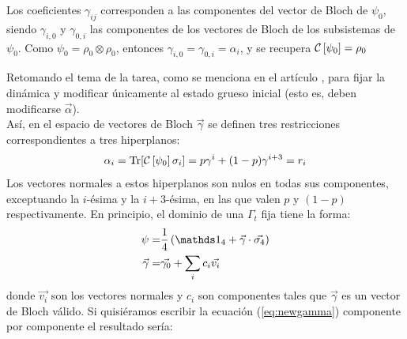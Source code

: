 Los coeficientes $\gamma_{ij}$ corresponden a las componentes del vector de Bloch de $\psi_{0}$, siendo $\gamma_{i,0}$ y $\gamma_{0,i}$ las componentes de los vectores de Bloch de los subsistemas de $\psi_{0}$. Como $\psi_{0}=\rho_{0}\otimes\rho_{0}$, entonces $\gamma_{i,0}=\gamma_{0,i}=\alpha_{i}$, y se recupera $\mathcal{C}\left[\psi_{0}\right]=\rho_{0}$

Retomando el tema de la tarea, como se menciona en el artículo \cite{CGEmergingDynamics}, para fijar la dinámica y modificar únicamente al estado grueso inicial (esto es, deben modificarse $\vec{\alpha}$).\\
Así, en el espacio de vectores de Bloch $\vec{\gamma}$ se definen tres restricciones correspondientes a tres hiperplanos:
\begin{align}
\alpha_{i}=\Tr[\mathcal{C}\left[\psi_{0}\right]\sigma_{i}]=p\gamma^{i}+(1-p)\gamma^{i+3}=r_{i}
\end{align}
Los vectores normales a estos hiperplanos son nulos en todas sus componentes, exceptuando la $i$-ésima y la $i+3$-ésima, en las que valen $p$ y $(1-p)$ respectivamente. En principio, el dominio de una $\Gamma_{t}$ fija tiene la forma:
\begin{align}
\psi=&\frac{1}{4}\left( \Id_{4}+\vec{\gamma}\cdot\vec{\sigma_{4}} \right)\\
\vec{\gamma}=&\vec{\gamma_{0}}+\sum_{i}c_{i}\vec{v_{i}}\label{eq:newgamma}
\end{align}
donde $\vec{v_{i}}$ son los vectores normales y $c_{i}$ son componentes tales que $\vec{\gamma}$ es un vector de Bloch válido. Si quisiéramos escribir la ecuación (\ref{eq:newgamma})  componente por componente el resultado sería:
